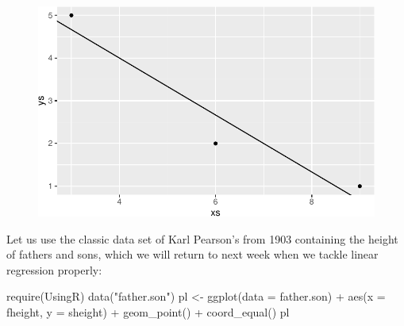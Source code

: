 \documentclass[
  letterpaper,
  DIV=11,
  numbers=noendperiod]{scrreprt}
\newenvironment{Shaded}{\begin{snugshade}}{\end{snugshade}}
\newcommand{\AttributeTok}[1]{\textcolor[rgb]{0.40,0.45,0.13}{#1}}
\newcommand{\FunctionTok}[1]{\textcolor[rgb]{0.28,0.35,0.67}{#1}}
\newcommand{\NormalTok}[1]{\textcolor[rgb]{0.00,0.23,0.31}{#1}}
\newcommand{\OtherTok}[1]{\textcolor[rgb]{0.00,0.23,0.31}{#1}}
\newcommand{\SpecialCharTok}[1]{\textcolor[rgb]{0.37,0.37,0.37}{#1}}
\newcommand{\StringTok}[1]{\textcolor[rgb]{0.13,0.47,0.30}{#1}}
\begin{document}
\begin{figure}[H]

{\centering \includegraphics{./07-linalg_files/figure-pdf/unnamed-chunk-4-1.pdf}

}

\end{figure}

Let us use the classic data set of Karl Pearson's from 1903 containing
the height of fathers and sons, which we will return to next week when
we tackle linear regression properly:

\begin{Shaded}
\begin{Highlighting}[]
\FunctionTok{require}\NormalTok{(UsingR)}
\FunctionTok{data}\NormalTok{(}\StringTok{"father.son"}\NormalTok{)}
\NormalTok{pl }\OtherTok{\textless{}{-}} \FunctionTok{ggplot}\NormalTok{(}\AttributeTok{data =}\NormalTok{ father.son) }\SpecialCharTok{+} 
  \FunctionTok{aes}\NormalTok{(}\AttributeTok{x =}\NormalTok{ fheight, }\AttributeTok{y =}\NormalTok{ sheight) }\SpecialCharTok{+} 
  \FunctionTok{geom\_point}\NormalTok{() }\SpecialCharTok{+} 
  \FunctionTok{coord\_equal}\NormalTok{()}
\NormalTok{pl}
\end{Highlighting}
\end{Shaded}
\end{document}
